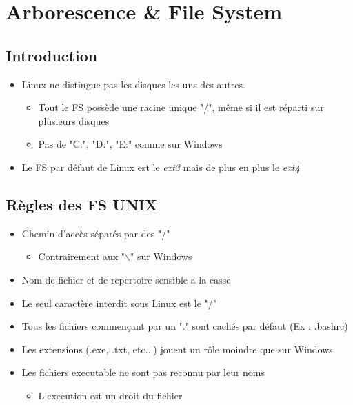 \documentclass[a4paper]{article}
\begin{document}
    \section{Arborescence \& File System}
    \subsection{Introduction}
    \begin{itemize}[label=\textbullet, font=\Large]
      \item Linux ne distingue pas les disques les uns des autres.
      \begin{itemize}[label=, font=\scriptsize]
        \item Tout le FS possède une racine unique "/", même si il est réparti sur plusieurs disques
        \item Pas de "C:", "D:", "E:" comme sur Windows
      \end{itemize}
      \item Le FS par défaut de Linux est le \emph{ext3} mais de plus en plus le \emph{ext4}
    \end{itemize}
    \subsection{Règles des FS UNIX}
    \begin{itemize}[label=\textbullet, font=\Large]
      \item Chemin d'accès séparés par des "/"
      \begin{itemize}[label=, font=\scriptsize]
        \item Contrairement aux "$\backslash$" sur Windows
      \end{itemize}
      \item Nom de fichier et de repertoire sensible a la casse
      \item Le seul caractère interdit sous Linux est le "/"
      \item Tous les fichiers commençant par un "." sont cachés par défaut (Ex : .bashrc)
      \item Les extensions (.exe, .txt, etc...) jouent un rôle moindre que sur Windows
      \item Les fichiers executable ne sont pas reconnu par leur noms
      \begin{itemize}[label=, font=\scriptsize]
        \item L'execution est un droit du fichier
      \end{itemize}
    \end{itemize}
\end{document}
